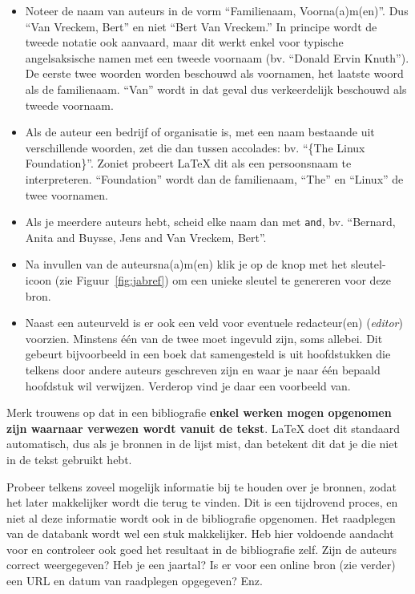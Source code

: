 \begin{itemize}
  \item Noteer de naam van auteurs in de vorm ``Familienaam, Voorna(a)m(en)''. Dus ``Van Vreckem, Bert'' en niet ``Bert Van Vreckem.'' In principe wordt de tweede notatie ook aanvaard, maar dit werkt enkel voor typische angelsaksische namen met een tweede voornaam (bv. ``Donald Ervin Knuth''). De eerste twee woorden worden beschouwd als voornamen, het laatste woord als de familienaam. ``Van'' wordt in dat geval dus verkeerdelijk beschouwd als tweede voornaam.
  \item Als de auteur een bedrijf of organisatie is, met een naam bestaande uit verschillende woorden, zet die dan tussen accolades: bv. ``\{The Linux Foundation\}''. Zoniet probeert {\LaTeX} dit als een persoonsnaam te interpreteren. ``Foundation'' wordt dan de familienaam, ``The'' en ``Linux'' de twee voornamen.
  \item Als je meerdere auteurs hebt, scheid elke naam dan met \texttt{and}, bv. ``Bernard, Anita and Buysse, Jens and Van Vreckem, Bert''.
  \item Na invullen van de auteursna(a)m(en) klik je op de knop met het sleutel-icoon (zie Figuur~\ref{fig:jabref}) om een unieke sleutel te genereren voor deze bron.
  \item Naast een auteurveld is er ook een veld voor eventuele redacteur(en) (\emph{editor}) voorzien. Minstens één van de twee moet ingevuld zijn, soms allebei. Dit gebeurt bijvoorbeeld in een boek dat samengesteld is uit hoofdstukken die telkens door andere auteurs geschreven zijn en waar je naar één bepaald hoofdstuk wil verwijzen. Verderop vind je daar een voorbeeld van.
\end{itemize}

Merk trouwens op dat in een bibliografie \textbf{enkel werken mogen opgenomen zijn waarnaar verwezen wordt vanuit de tekst}. {\LaTeX} doet dit standaard automatisch, dus als je bronnen in de lijst mist, dan betekent dit dat je die niet in de tekst gebruikt hebt.

Probeer telkens zoveel mogelijk informatie bij te houden over je bronnen, zodat het later makkelijker wordt die terug te vinden. Dit is een tijdrovend proces, en niet al deze informatie wordt ook in de bibliografie opgenomen. Het raadplegen van de databank wordt wel een stuk makkelijker. Heb hier voldoende aandacht voor en controleer ook goed het resultaat in de bibliografie zelf. Zijn de auteurs correct weergegeven? Heb je een jaartal? Is er voor een online bron (zie verder) een URL en datum van raadplegen opgegeven? Enz.


